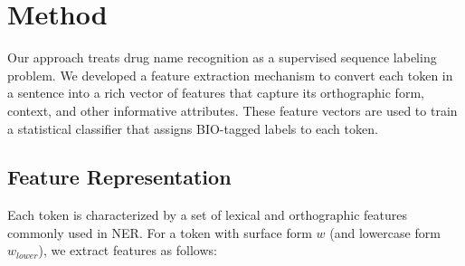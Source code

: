 \section{Method}
\label{sec:methodology}

Our approach treats drug name recognition as a supervised sequence labeling problem. We developed a feature extraction mechanism to convert each token in a sentence into a rich vector of features that capture its orthographic form, context, and other informative attributes. These feature vectors are used to train a statistical classifier that assigns BIO-tagged labels to each token.

\subsection{Feature Representation}
Each token is characterized by a set of lexical and orthographic features commonly used in NER. For a token with surface form $w$ (and lowercase form $w_{lower}$), we extract features as follows:

